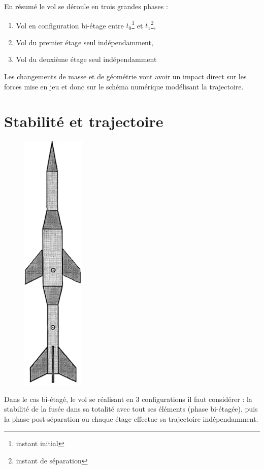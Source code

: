 \documentclass[a4paper]{article}
\begin{document}
En résumé le vol se déroule en trois grandes phases : 

\begin{enumerate}

\item Vol en configuration bi-étage entre $t_{0}$\footnote{instant initial} et $t_{1}$\footnote{instant de séparation},
\item Vol du premier étage seul indépendamment,
\item Vol du deuxième étage seul indépendamment

\end{enumerate}



Les changements de masse et de géométrie vont avoir un impact direct sur les forces mise en jeu et donc sur le schéma numérique modélisant la trajectoire.


\section{Stabilité et trajectoire}


\begin{figure}

\includegraphics[width=3cm]{bietage.png}
\end{figure}

Dans le cas bi-étagé, le vol se réalisant en 3 configurations il faut considérer : la
stabilité de la fusée dans sa totalité avec tout ses éléments (phase bi-étagée), puis la phase post-séparation ou
chaque étage effectue sa trajectoire indépendamment.\\
\end{document}
